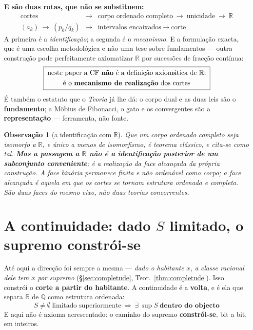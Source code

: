 \documentclass[11pt,a4paper]{article}
\newtheorem{observacao}[teorema]{Observação}
\begin{document}
\noindent\textbf{E são duas rotas, que não se substituem:}
\[
\boxed{
\begin{array}{lcl}
\text{cortes} &\longrightarrow& \text{corpo ordenado completo}
\ \longrightarrow\ \text{unicidade}\ \longrightarrow\ \mathbb{R}\\[4pt]
(a_k) \ \longrightarrow\ (p_k/q_k) &\longrightarrow&
\text{intervalos encaixados}\ \longrightarrow\ \text{corte}
\end{array}}
\]
A primeira é a \emph{identificação}; a segunda é o \emph{mecanismo}. E a
formulação exacta, que é uma escolha metodológica e não uma tese sobre
fundamentos --- outra construção pode perfeitamente axiomatizar $\mathbb{R}$ por
sucessões de fracção contínua:
\[
\boxed{\;\begin{gathered}
\text{neste paper a CF \textbf{não} é a definição axiomática de }\mathbb{R};\\
\text{é o \textbf{mecanismo de realização} dos cortes}
\end{gathered}\;}
\]
É também o estatuto que o \emph{Teoria} já lhe dá: o corpo dual e as duas leis são
o \textbf{fundamento}; a Möbius de Fibonacci, o gato e os convergentes são a
\textbf{representação} --- ferramenta, não fonte.

\begin{observacao}[a identificação com $\mathbb{R}$]
Que um corpo ordenado completo seja isomorfo a $\mathbb{R}$, e único a menos de
isomorfismo, é teorema clássico, e cita-se como tal. \textbf{Mas a passagem a
$\mathbb{R}$ não é a identificação posterior de um subconjunto conveniente}: é
a realização da \emph{face alcançada} da própria construção. A face binária
permanece finita e não ordenável como corpo; a face alcançada é aquela em que
os cortes se tornam estrutura ordenada e completa. \emph{São duas faces do
mesmo eixo, não duas teorias concorrentes.}
\end{observacao}

\section{A continuidade: dado $S$ limitado, o supremo constrói-se}\label{sec:supremo}

\noindent Até aqui a direcção foi sempre a mesma --- \emph{dado o habitante $x$, a
classe racional dele tem $x$ por supremo} (\S\ref{sec:completude},
Teor.~\ref{thm:completude}). Isso constrói o \textbf{corte a partir do habitante}.
A continuidade é a \textbf{volta}, e é ela que separa $\mathbb{R}$ de $\mathbb{Q}$
como estrutura ordenada:
\[
\boxed{\;S\neq\emptyset\ \text{limitado superiormente}
\ \Longrightarrow\ \exists\,\sup S\ \textbf{dentro do objecto}\;}
\]
E aqui não é axioma acrescentado: o caminho do supremo \textbf{constrói-se}, bit a
bit, em inteiros.
\end{document}
